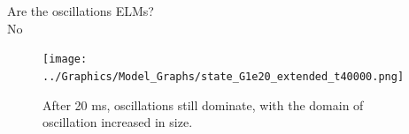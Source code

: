 \documentclass[10pt]{beamer}
\begin{document}
\begin{frame}
\centering
Are the oscillations ELMs? \\
\Huge No
\end{frame}

\begin{frame} %

\begin{figure}[h]
\begin{minipage}{0.69\linewidth}
	\texttt{[image: ../Graphics/Model\_Graphs/state\_G1e20\_extended\_t40000.png]}
\end{minipage}
\begin{minipage}{0.29\linewidth}
	\caption{After 20 ms, oscillations still dominate, with the domain of oscillation increased in size.}
\end{minipage}
\end{figure}

\end{frame}
\end{document}
